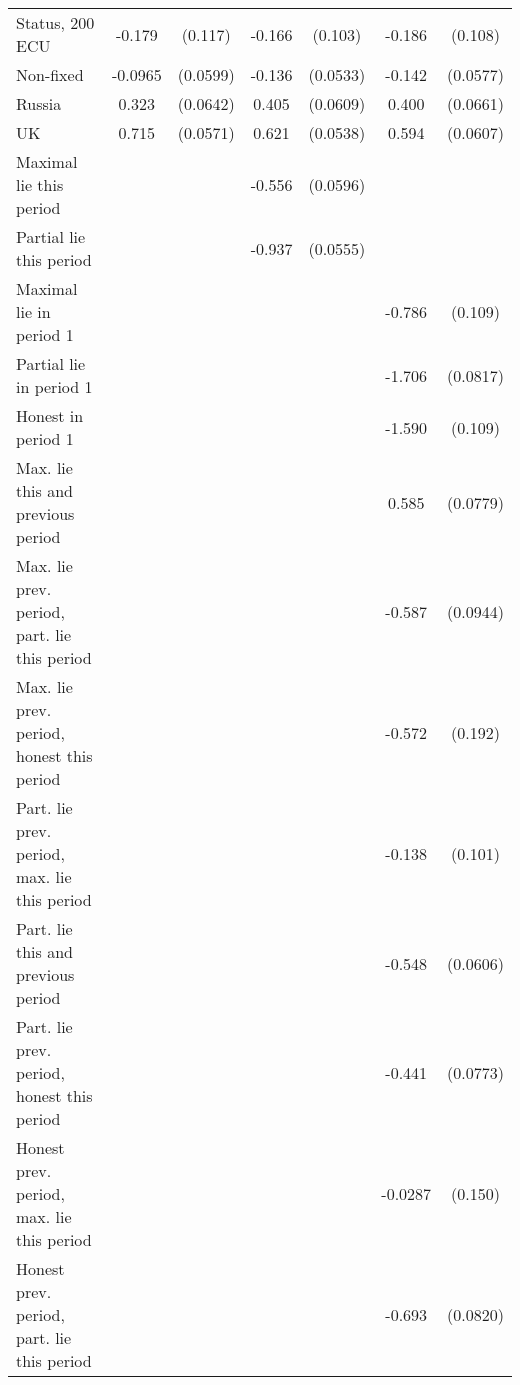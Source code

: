 {\begin{tabular}{l*{3}{cc}}
Status, 200 ECU &   -0.179         &  (0.117)&   -0.166         &  (0.103)&   -0.186\sym{*}  &  (0.108)\\
Non-fixed       &  -0.0965         & (0.0599)&   -0.136\sym{**} & (0.0533)&   -0.142\sym{**} & (0.0577)\\
Russia          &    0.323\sym{***}& (0.0642)&    0.405\sym{***}& (0.0609)&    0.400\sym{***}& (0.0661)\\
UK              &    0.715\sym{***}& (0.0571)&    0.621\sym{***}& (0.0538)&    0.594\sym{***}& (0.0607)\\
Maximal lie this period&                  &         &   -0.556\sym{***}& (0.0596)&                  &         \\
Partial lie this period&                  &         &   -0.937\sym{***}& (0.0555)&                  &         \\
Maximal lie in period 1&                  &         &                  &         &   -0.786\sym{***}&  (0.109)\\
Partial lie in period 1&                  &         &                  &         &   -1.706\sym{***}& (0.0817)\\
Honest in period 1&                  &         &                  &         &   -1.590\sym{***}&  (0.109)\\
Max. lie this and previous period&                  &         &                  &         &    0.585\sym{***}& (0.0779)\\
Max. lie prev. period, part. lie this period&                  &         &                  &         &   -0.587\sym{***}& (0.0944)\\
Max. lie prev. period, honest this period&                  &         &                  &         &   -0.572\sym{***}&  (0.192)\\
Part. lie prev. period, max. lie this period&                  &         &                  &         &   -0.138         &  (0.101)\\
Part. lie this and previous period&                  &         &                  &         &   -0.548\sym{***}& (0.0606)\\
Part. lie prev. period, honest this period&                  &         &                  &         &   -0.441\sym{***}& (0.0773)\\
Honest prev. period, max. lie this period&                  &         &                  &         &  -0.0287         &  (0.150)\\
Honest prev. period, part. lie this period&                  &         &                  &         &   -0.693\sym{***}& (0.0820)\\

\end{tabular}}
